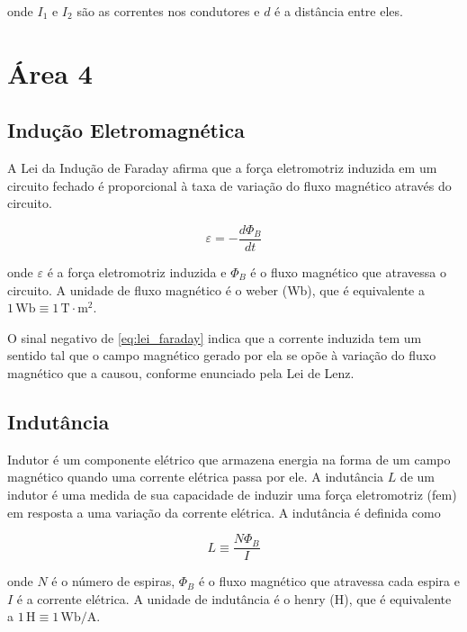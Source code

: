 \documentclass[12pt]{article}
\begin{document}
\noindent onde \(I_1\) e \(I_2\) são as correntes nos condutores e \(d\) é a distância entre eles.

\newpage

\section{Área 4}

\subsection{Indução Eletromagnética}

A Lei da Indução de Faraday afirma que a força eletromotriz induzida em um circuito fechado é proporcional à taxa de variação do fluxo magnético através do circuito.

\begin{equation}\label{eq:lei_faraday}
    \boxed{\varepsilon = -\frac{d\Phi_{B}}{dt}}
\end{equation}

\noindent onde \(\varepsilon\) é a força eletromotriz induzida e \(\Phi_{B}\) é o fluxo magnético que atravessa o circuito. A unidade de fluxo magnético é o weber (Wb), que é equivalente a \(1 \, \text{Wb} \equiv 1 \, \text{T}\cdot\text{m}^2\).

O sinal negativo de \eqref{eq:lei_faraday} indica que a corrente induzida tem um sentido tal que o campo magnético gerado por ela se opõe à variação do fluxo magnético que a causou, conforme enunciado pela Lei de Lenz.

\subsection{Indutância}

Indutor é um componente elétrico que armazena energia na forma de um campo magnético quando uma corrente elétrica passa por ele. A indutância \(L\) de um indutor é uma medida de sua capacidade de induzir uma força eletromotriz (fem) em resposta a uma variação da corrente elétrica. A indutância é definida como

\begin{equation}
    \boxed{L \equiv \frac{N\Phi_{B}}{I}}
\end{equation}

\noindent onde \(N\) é o número de espiras, \(\Phi_{B}\) é o fluxo magnético que atravessa cada espira e \(I\) é a corrente elétrica. A unidade de indutância é o henry (H), que é equivalente a \(1 \, \text{H} \equiv 1 \, \text{Wb}/\text{A}\).
\end{document}
